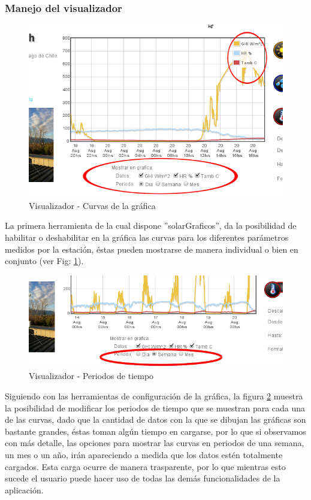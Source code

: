 \subsubsection{Manejo del visualizador}
\begin{figure}[ht]
        \centering
        \includegraphics[scale=0.4]{./images/cap5chap1img1}
        \caption{Visualizador - Curvas de la gráfica}
        \label{visualizador}
\end{figure}
La primera herramienta de la cual dispone ''solarGraficos'', da la posibilidad de habilitar o deshabilitar en la gráfica las curvas para los diferentes parámetros medidos por la estación, éstas pueden mostrarse de manera individual o bien en conjunto (ver Fig: \ref{visualizador}).

\begin{figure}[ht]
        \centering
        \includegraphics[scale=0.4]{./images/cap5chap1img3}
        \caption{Visualizador - Periodos de tiempo}
        \label{visualizadorTiempo}
\end{figure}
Siguiendo con las herramientas de configuración de la gráfica, la figura \ref{visualizadorTiempo} muestra la posibilidad de modificar los periodos de tiempo que se muestran para cada una de las curvas, dado que la cantidad de datos con la que se dibujan las gráficas son bastante grandes, éstas toman algún tiempo en cargarse, por lo que si observamos con más detalle, las opciones para mostrar las curvas en periodos de una semana, un mes o un año, irán apareciendo a medida que los datos estén totalmente cargados. Esta carga ocurre de manera trasparente, por lo que mientras esto sucede el usuario puede hacer uso de todas las demás funcionalidades de la aplicación.\\

